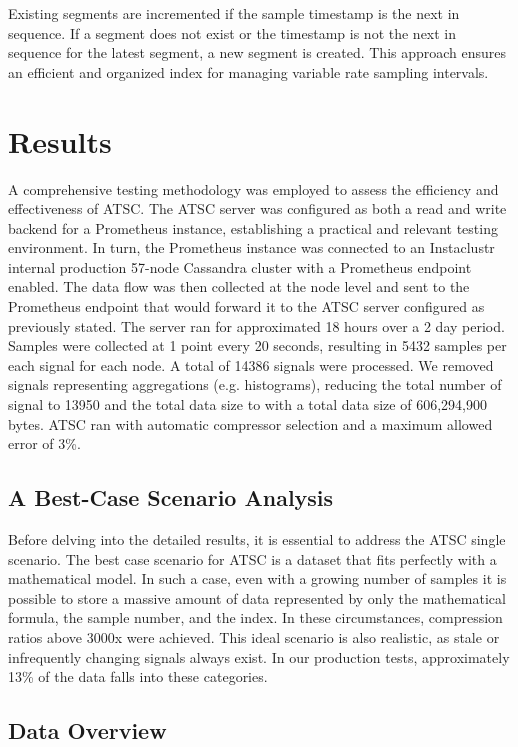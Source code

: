 \documentclass[conference]{IEEEtran}
\begin{document}
Existing segments are incremented if the sample timestamp is the next in sequence. If a segment does not exist or the timestamp is not the next in sequence for the latest segment, a new segment is created. This approach ensures an efficient and organized index for managing variable rate sampling intervals.

\section{Results}

A comprehensive testing methodology was employed to assess the efficiency and effectiveness of ATSC. The ATSC server was configured as both a read and write backend for a Prometheus\cite{prometheus} instance, establishing a practical and relevant testing environment. 
In turn, the Prometheus instance was connected to an Instaclustr internal production 57-node Cassandra\cite{cassandra} cluster with a Prometheus endpoint enabled. The data flow was then collected at the node level and sent to the Prometheus endpoint that would forward it to the ATSC server configured as previously stated.
The server ran for approximated 18 hours over a 2 day period. Samples were collected at 1 point every 20 seconds, resulting in 5432 samples per each signal for each node. A total of 14386 signals were processed.
We removed signals representing aggregations (e.g. histograms), reducing the total number of signal to 13950 and the total data size to  with a total data size of 606,294,900 bytes.
ATSC ran with automatic compressor selection and a maximum allowed error of 3\%.

\subsection{A Best-Case Scenario Analysis}

Before delving into the detailed results, it is essential to address the ATSC single scenario.
The best case scenario for ATSC is a dataset that fits perfectly with a mathematical model.
In such a case, even with a growing number of samples it is possible to store a massive amount of data represented by only the mathematical formula, the sample number, and the index. In these circumstances, compression ratios above 3000x were achieved.
This ideal scenario is also realistic, as stale or infrequently changing signals always exist.
In our production tests, approximately 13\% of the data falls into these categories.

\subsection{Data Overview}
\end{document}
